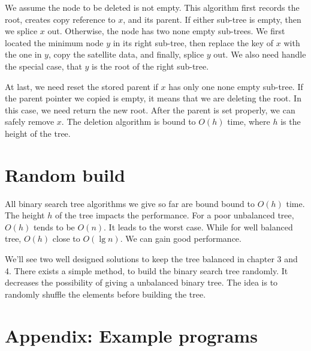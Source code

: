 \documentclass[b5paper]{article}
\begin{document}
We assume the node to be deleted is not empty. This algorithm first records the root, creates copy reference to $x$, and its parent. If either sub-tree is empty, then we splice $x$ out. Otherwise, the node has two none empty sub-trees. We first located the minimum node $y$ in its right sub-tree, then replace the key of $x$ with the one in $y$, copy the satellite data, and finally, splice $y$ out. We also need handle the special case, that $y$ is the root of the right sub-tree.

At last, we need reset the stored parent if $x$ has only one none empty sub-tree. If the parent pointer we copied is empty, it means that we are deleting the root. In this case, we need return the new root. After the parent is set properly, we can safely remove $x$. The deletion algorithm is bound to $O(h)$ time, where $h$ is the height of the tree.

\begin{Exercise}


\end{Exercise}

\section{Random build}
All binary search tree algorithms we give so far are bound bound to $O(h)$ time. The height $h$ of the tree impacts the performance. For a poor unbalanced tree, $O(h)$ tends to be $O(n)$. It leads to the worst case. While for well balanced tree, $O(h)$ close to $O(\lg n)$. We can gain good performance.

We'll see two well designed solutions to keep the tree balanced in chapter 3 and 4. There exists a simple method, to build the binary search tree randomly\cite{CLRS}. It decreases the possibility of giving a unbalanced binary tree. The idea is to randomly shuffle the elements before building the tree.

\begin{Exercise}
\end{Exercise}

\section{Appendix: Example programs}
\end{document}
